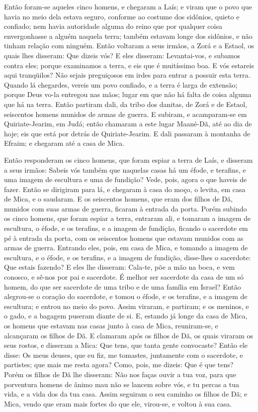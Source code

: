 Então foram-se aqueles cinco homens, e chegaram a Laís; e viram
que o povo que havia no meio dela estava seguro, conforme ao costume
dos sidônios, quieto e confiado; nem havia autoridade alguma do
reino que por qualquer coisa envergonhasse a alguém naquela terra;
também estavam longe dos sidônios, e não tinham relação com ninguém.
Então voltaram a seus irmãos, a Zorá e a Estaol, os quais lhes
disseram: Que dizeis vós? E eles disseram: Levantai-vos, e
subamos contra eles; porque examinamos a terra, e eis que é
muitíssimo boa. E vós estareis aqui tranqüilos? Não sejais
preguiçosos em irdes para entrar a possuir esta terra. Quando
lá chegardes, vereis um povo confiado, e a terra é larga de
extensão; porque Deus vo-la entregou nas mãos; lugar em que não há
falta de coisa alguma que há na terra. Então partiram dali,
da tribo dos danitas, de Zorá e de Estaol, seiscentos homens munidos
de armas de guerra. E subiram, e acamparam-se em
Quiriate-Jearim, em Judá; então chamaram a este lugar Maané-Dã, até
ao dia de hoje; eis que está por detrás de Quiriate-Jearim. E
dali passaram à montanha de Efraim; e chegaram até a casa de Mica.

Então responderam os cinco homens, que foram espiar a terra de
Laís, e disseram a seus irmãos: Sabeis vós também que naquelas casas
há um éfode, e terafins, e uma imagem de escultura e uma de
fundição? Vede, pois, agora o que haveis de fazer. Então se
dirigiram para lá, e chegaram à casa do moço, o levita, em casa de
Mica, e o saudaram. E os seiscentos homens, que eram dos
filhos de Dã, munidos com suas armas de guerra, ficaram à entrada da
porta. Porém subindo os cinco homens, que foram espiar a
terra, entraram ali, e tomaram a imagem de escultura, o éfode, e os
terafins, e a imagem de fundição, ficando o sacerdote em pé à
entrada da porta, com os seiscentos homens que estavam munidos com
as armas de guerra. Entrando eles, pois, em casa de Mica, e
tomando a imagem de escultura, e o éfode, e os terafins, e a imagem
de fundição, disse-lhes o sacerdote: Que estais fazendo? E
eles lhe disseram: Cala-te, põe a mão na boca, e vem conosco, e
sê-nos por pai e sacerdote. É melhor ser sacerdote da casa de um só
homem, do que ser sacerdote de uma tribo e de uma família em Israel?
Então alegrou-se o coração do sacerdote, e tomou o éfode, e
os terafins, e a imagem de escultura; e entrou no meio do povo.
Assim viraram, e partiram; e os meninos, e o gado, e a
bagagem puseram diante de si. E, estando já longe da casa de
Mica, os homens que estavam nas casas junto à casa de Mica,
reuniram-se, e alcançaram os filhos de Dã. E clamaram após os
filhos de Dã, os quais viraram os seus rostos, e disseram a Mica:
Que tens, que tanta gente convocaste? Então ele disse: Os
meus deuses, que eu fiz, me tomastes, juntamente com o sacerdote, e
partistes; que mais me resta agora? Como, pois, me dizeis: Que é que
tens? Porém os filhos de Dã lhe disseram: Não nos faças ouvir
a tua voz, para que porventura homens de ânimo mau não se lancem
sobre vós, e tu percas a tua vida, e a vida dos da tua casa.
Assim seguiram o seu caminho os filhos de Dã; e Mica, vendo
que eram mais fortes do que ele, virou-se, e voltou à sua casa.

